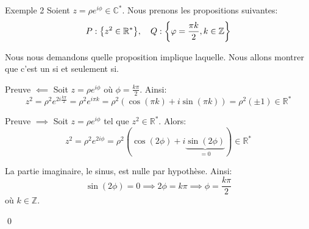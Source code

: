 \documentclass[a4paper]{article}
\begin{document}
\begin{parag}{Exemple 2}
    Soient $z = \rho e^{i\phi} \in \mathbb{C}^*$. Nous prenons les propositions suivantes: 
    \[P : \left\{z^{2} \in \mathbb{R}^*\right\}, \mathspace Q : \left\{\phi = \frac{\pi k}{2}, k \in\mathbb{Z}\right\}\]
    
    Nous nous demandons quelle proposition implique laquelle. Nous allons montrer que c'est un si et seulement si.

    \begin{subparag}{Preuve $\impliedby$}
        Soit $z = \rho e^{i\phi}$ où $\phi = \frac{k\pi}{2}$. Ainsi: 
        \[z^2 = \rho^2 e^{2i \frac{k\pi}{2}} = \rho^2 e^{i\pi k} = \rho^2\left(\cos\left(\pi k\right) + i \sin\left(\pi k\right)\right) = \rho^2\left(\pm 1\right) \in \mathbb{R}^*\]
    \end{subparag}

    \begin{subparag}{Preuve $\implies$}
        Soit $z = \rho e^{i \phi}$ tel que $z^2 \in \mathbb{R}^*$. Alors: 
        \[z^2 = \rho^2 e^{2i\phi} = \rho^{2} \left(\cos\left(2\phi\right) + i\underbrace{\sin\left(2\phi\right)}_{= 0}\right) \in \mathbb{R}^*\]
        
        La partie imaginaire, le sinus, est nulle par hypothèse. Ainsi: 
        \[\sin\left(2\phi\right) = 0 \implies 2\phi = k\pi \implies \phi = \frac{k\pi}{2}\]
        où $k \in\mathbb{Z}$.

        \qed
    \end{subparag}
\end{parag}
\end{document}
